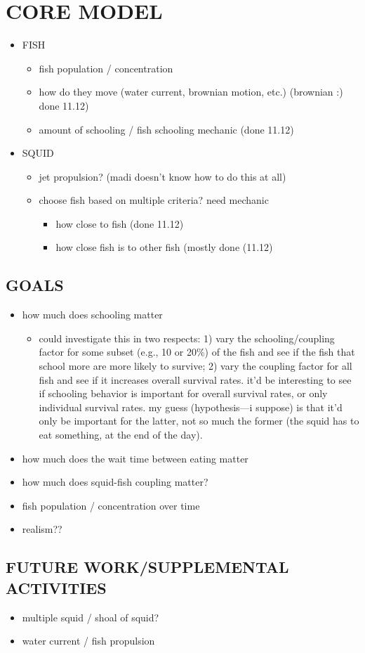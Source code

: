 \documentclass[12pt]{article}
\begin{document}
\section{CORE MODEL}
\begin{itemize}
    \item FISH
    \begin{itemize}
        \item fish population / concentration
        \item how do they move (water current, brownian motion, etc.) (brownian :) done 11.12)
        \item amount of schooling / fish schooling mechanic (done 11.12)
    \end{itemize}
    \item SQUID
    \begin{itemize}
        \item jet propulsion? (madi doesn't know how to do this at all)
        \item choose fish based on multiple criteria? need mechanic
        \begin{itemize}
            \item how close to fish (done 11.12)
            \item how close fish is to other fish (mostly done (11.12)
        \end{itemize}
    \end{itemize}
\end{itemize}


\subsection{GOALS}
\begin{itemize}
    \item how much does schooling matter
    \begin{itemize}
        \item could investigate this in two respects: 1) vary the schooling/coupling factor for some subset (e.g., 10 or 20\%) of the fish and see if the fish that school more are more likely to survive; 2) vary the coupling factor for all fish and see if it increases overall survival rates. it'd be interesting to see if schooling behavior is important for overall survival rates, or only individual survival rates. my guess (hypothesis---i suppose) is that it'd only be important for the latter, not so much the former (the squid has to eat something, at the end of the day).
    \end{itemize}
    \item how much does the wait time between eating matter
    \item how much does squid-fish coupling matter?
    \item fish population / concentration over time
    \item realism??
\end{itemize}

\subsection{FUTURE WORK/SUPPLEMENTAL ACTIVITIES}
\begin{itemize}
    \item multiple squid / shoal of squid?
    \item water current / fish propulsion
\end{itemize}
\end{document}
